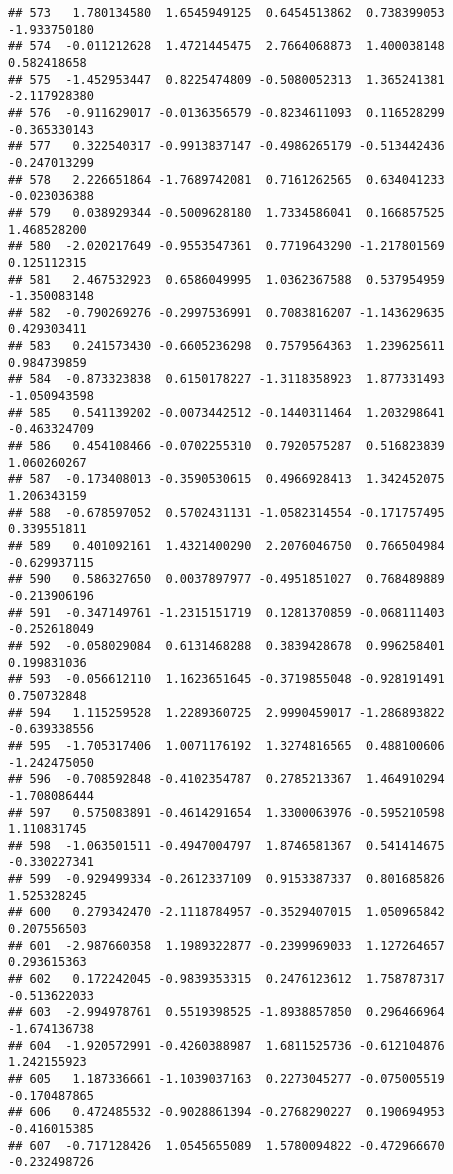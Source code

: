 \documentclass[
]{article}
\begin{document}
\begin{verbatim}
## 573   1.780134580  1.6545949125  0.6454513862  0.738399053 -1.933750180
## 574  -0.011212628  1.4721445475  2.7664068873  1.400038148  0.582418658
## 575  -1.452953447  0.8225474809 -0.5080052313  1.365241381 -2.117928380
## 576  -0.911629017 -0.0136356579 -0.8234611093  0.116528299 -0.365330143
## 577   0.322540317 -0.9913837147 -0.4986265179 -0.513442436 -0.247013299
## 578   2.226651864 -1.7689742081  0.7161262565  0.634041233 -0.023036388
## 579   0.038929344 -0.5009628180  1.7334586041  0.166857525  1.468528200
## 580  -2.020217649 -0.9553547361  0.7719643290 -1.217801569  0.125112315
## 581   2.467532923  0.6586049995  1.0362367588  0.537954959 -1.350083148
## 582  -0.790269276 -0.2997536991  0.7083816207 -1.143629635  0.429303411
## 583   0.241573430 -0.6605236298  0.7579564363  1.239625611  0.984739859
## 584  -0.873323838  0.6150178227 -1.3118358923  1.877331493 -1.050943598
## 585   0.541139202 -0.0073442512 -0.1440311464  1.203298641 -0.463324709
## 586   0.454108466 -0.0702255310  0.7920575287  0.516823839  1.060260267
## 587  -0.173408013 -0.3590530615  0.4966928413  1.342452075  1.206343159
## 588  -0.678597052  0.5702431131 -1.0582314554 -0.171757495  0.339551811
## 589   0.401092161  1.4321400290  2.2076046750  0.766504984 -0.629937115
## 590   0.586327650  0.0037897977 -0.4951851027  0.768489889 -0.213906196
## 591  -0.347149761 -1.2315151719  0.1281370859 -0.068111403 -0.252618049
## 592  -0.058029084  0.6131468288  0.3839428678  0.996258401  0.199831036
## 593  -0.056612110  1.1623651645 -0.3719855048 -0.928191491  0.750732848
## 594   1.115259528  1.2289360725  2.9990459017 -1.286893822 -0.639338556
## 595  -1.705317406  1.0071176192  1.3274816565  0.488100606 -1.242475050
## 596  -0.708592848 -0.4102354787  0.2785213367  1.464910294 -1.708086444
## 597   0.575083891 -0.4614291654  1.3300063976 -0.595210598  1.110831745
## 598  -1.063501511 -0.4947004797  1.8746581367  0.541414675 -0.330227341
## 599  -0.929499334 -0.2612337109  0.9153387337  0.801685826  1.525328245
## 600   0.279342470 -2.1118784957 -0.3529407015  1.050965842  0.207556503
## 601  -2.987660358  1.1989322877 -0.2399969033  1.127264657  0.293615363
## 602   0.172242045 -0.9839353315  0.2476123612  1.758787317 -0.513622033
## 603  -2.994978761  0.5519398525 -1.8938857850  0.296466964 -1.674136738
## 604  -1.920572991 -0.4260388987  1.6811525736 -0.612104876  1.242155923
## 605   1.187336661 -1.1039037163  0.2273045277 -0.075005519 -0.170487865
## 606   0.472485532 -0.9028861394 -0.2768290227  0.190694953 -0.416015385
## 607  -0.717128426  1.0545655089  1.5780094822 -0.472966670 -0.232498726

\end{verbatim}
\end{document}
